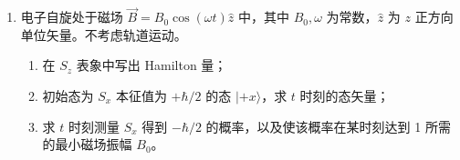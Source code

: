 \begin{enumerate}
{\begin{enumerate}
		基态 $(n_a,n_b)=(0,0)$ 的波函数为两谐振子基态之积：
		\begin{align*}
			\psi_0(x_a,x_b)&=\left(\frac{m\omega_a}{\pi\hbar}\right)^{1/4}e^{-m\omega_a x_a^2/(2\hbar)}\cdot\left(\frac{m\omega_b}{\pi\hbar}\right)^{1/4}e^{-m\omega_b x_b^2/(2\hbar)}\\
			&=\left(\frac{m^2\omega_a\omega_b}{\pi^2\hbar^2}\right)^{1/4}\exp\!\left(-\frac{m\omega_a x_a^2+m\omega_b x_b^2}{2\hbar}\right)
		\end{align*}

		\item 能量一级修正为
		\begin{align*}
			E_{n_a,n_b}^{(1)}=\langle n_a,n_b|\varepsilon x_a^2 x_b^2|n_a,n_b\rangle=\varepsilon\langle n_a|x_a^2|n_a\rangle\langle n_b|x_b^2|n_b\rangle
		\end{align*}
		利用谐振子结果 $\langle n|x^2|n\rangle=\dfrac{\hbar}{m\omega}\left(n+\dfrac{1}{2}\right)$：
		\begin{align*}
			E_{n_a,n_b}^{(1)}&=\varepsilon\cdot\frac{\hbar}{m\omega_a}\left(n_a+\frac{1}{2}\right)\cdot\frac{\hbar}{m\omega_b}\left(n_b+\frac{1}{2}\right)\\
			&=\frac{\varepsilon\hbar^2}{m^2\omega_a\omega_b}\left(n_a+\frac{1}{2}\right)\left(n_b+\frac{1}{2}\right)
		\end{align*}
	\end{enumerate}
	}

	\item
	电子自旋处于磁场 $\vec{B}=B_0\cos(\omega t)\hat{z}$ 中，其中 $B_0,\omega$ 为常数，$\hat{z}$ 为 $z$ 正方向单位矢量。不考虑轨道运动。
	\begin{enumerate}
		\item 在 $S_z$ 表象中写出 Hamilton 量；
		\item 初始态为 $S_x$ 本征值为 $+\hbar/2$ 的态 $|+x\rangle$，求 $t$ 时刻的态矢量；
		\item 求 $t$ 时刻测量 $S_x$ 得到 $-\hbar/2$ 的概率，以及使该概率在某时刻达到 1 所需的最小磁场振幅 $B_0$。
	\end{enumerate}

\end{enumerate}
